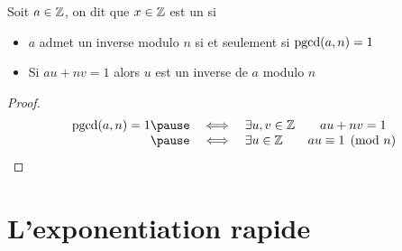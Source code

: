 \begin{frame}

Soit $a \in \mathbb{Z}$, on dit que $x \in \mathbb{Z}$ est un 
si 

\pause

\begin{proposition}
\begin{itemize}
  \item $a$ admet un inverse modulo $n$ si et seulement si $\mathop{\text{pgcd}}\nolimits(a,n)=1$
\pause
  \item Si $au+nv=1$ alors $u$ est un inverse de $a$ modulo $n$
\end{itemize}  
\end{proposition}

\pause

\begin{proof}
$$\begin{array}{rcl}
\pgcd(a,n)=1 
\pause
       & \iff & \exists u,v \in \Zz \qquad au+nv=1 \\
\pause
       & \iff & \exists u \in \Zz \qquad au \equiv 1 \pmod {n} \\
\end{array}$$
\end{proof}


\end{frame}
% 



\section{L'exponentiation rapide}

